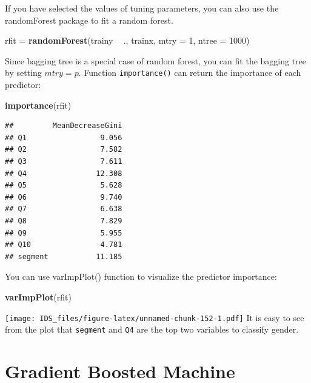 \documentclass[12pt,]{krantz}
\makeatletter
\newenvironment{Shaded}{\begin{snugshade}}{\end{snugshade}}
\newcommand{\DataTypeTok}[1]{\textcolor[rgb]{0.27,0.27,0.27}{#1}}
\newcommand{\DecValTok}[1]{\textcolor[rgb]{0.06,0.06,0.06}{#1}}
\newcommand{\KeywordTok}[1]{\textcolor[rgb]{0.27,0.27,0.27}{\textbf{#1}}}
\newcommand{\NormalTok}[1]{#1}
\newcommand{\OperatorTok}[1]{\textcolor[rgb]{0.43,0.43,0.43}{\textbf{#1}}}
\newcommand{\StringTok}[1]{\textcolor[rgb]{0.5,0.5,0.5}{#1}}
\newenvironment{kframe}{%
\medskip{}
\setlength{\fboxsep}{.8em}
 \def\at@end@of@kframe{}%
 \ifinner\ifhmode%
  \def\at@end@of@kframe{\end{minipage}}%
  \begin{minipage}{\columnwidth}%
 \fi\fi%
 \def\FrameCommand##1{\hskip\@totalleftmargin \hskip-\fboxsep
 \colorbox{shadecolor}{##1}\hskip-\fboxsep
     \hskip-\linewidth \hskip-\@totalleftmargin \hskip\columnwidth}%
 \MakeFramed {\advance\hsize-\width
   \@totalleftmargin\z@ \linewidth\hsize
   \@setminipage}}%
 {\par\unskip\endMakeFramed%
 \at@end@of@kframe}
\renewenvironment{Shaded}{\begin{kframe}}{\end{kframe}}
\makeatother
\begin{document}
If you have selected the values of tuning parameters, you can also use the randomForest package to fit a random forest.

\begin{Shaded}
\begin{Highlighting}[]
\NormalTok{rfit =}\StringTok{ }\KeywordTok{randomForest}\NormalTok{(trainy }\OperatorTok{~}\StringTok{ }\NormalTok{., trainx, }\DataTypeTok{mtry =} \DecValTok{1}\NormalTok{, }\DataTypeTok{ntree =} \DecValTok{1000}\NormalTok{)}
\end{Highlighting}
\end{Shaded}

Since bagging tree is a special case of random forest, you can fit the bagging tree by setting \(mtry=p\). Function \texttt{importance()} can return the importance of each predictor:

\begin{Shaded}
\begin{Highlighting}[]
\KeywordTok{importance}\NormalTok{(rfit)}
\end{Highlighting}
\end{Shaded}

\begin{verbatim}
##         MeanDecreaseGini
## Q1                 9.056
## Q2                 7.582
## Q3                 7.611
## Q4                12.308
## Q5                 5.628
## Q6                 9.740
## Q7                 6.638
## Q8                 7.829
## Q9                 5.955
## Q10                4.781
## segment           11.185
\end{verbatim}

You can use varImpPlot() function to visualize the predictor importance:

\begin{Shaded}
\begin{Highlighting}[]
\KeywordTok{varImpPlot}\NormalTok{(rfit)}
\end{Highlighting}
\end{Shaded}

\texttt{[image: IDS\_files/figure-latex/unnamed-chunk-152-1.pdf]}
It is easy to see from the plot that \texttt{segment} and \texttt{Q4} are the top two variables to classify gender.

\hypertarget{gradient-boosted-machine}{%
\section{Gradient Boosted Machine}\label{gradient-boosted-machine}}
\end{document}
